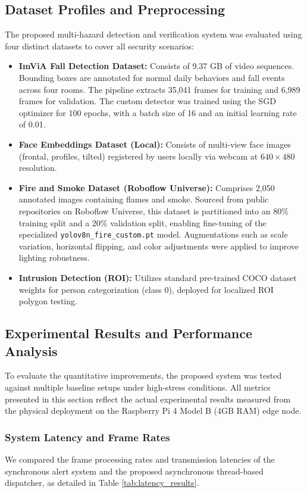 \documentclass[12pt,a4paper]{article}
\begin{document}
\subsection{Dataset Profiles and Preprocessing}
The proposed multi-hazard detection and verification system was evaluated using four distinct datasets to cover all security scenarios:
\begin{itemize}
    \item \textbf{ImViA Fall Detection Dataset:} Consists of 9.37 GB of video sequences. Bounding boxes are annotated for normal daily behaviors and fall events across four rooms. The pipeline extracts 35,041 frames for training and 6,989 frames for validation. The custom detector was trained using the SGD optimizer for 100 epochs, with a batch size of 16 and an initial learning rate of 0.01.
    \item \textbf{Face Embeddings Dataset (Local):} Consists of multi-view face images (frontal, profiles, tilted) registered by users locally via webcam at $640 \times 480$ resolution.
    \item \textbf{Fire and Smoke Dataset (Roboflow Universe):} Comprises 2,050 annotated images containing flames and smoke. Sourced from public repositories on Roboflow Universe, this dataset is partitioned into an 80\% training split and a 20\% validation split, enabling fine-tuning of the specialized \texttt{yolov8n\_fire\_custom.pt} model. Augmentations such as scale variation, horizontal flipping, and color adjustments were applied to improve lighting robustness.
    \item \textbf{Intrusion Detection (ROI):} Utilizes standard pre-trained COCO dataset weights for person categorization (class 0), deployed for localized ROI polygon testing.
\end{itemize}

\subsection{Experimental Results and Performance Analysis}
To evaluate the quantitative improvements, the proposed system was tested against multiple baseline setups under high-stress conditions. All metrics presented in this section reflect the actual experimental results measured from the physical deployment on the Raspberry Pi 4 Model B (4GB RAM) edge node.

\subsubsection*{System Latency and Frame Rates}
We compared the frame processing rates and transmission latencies of the synchronous alert system and the proposed asynchronous thread-based dispatcher, as detailed in Table \ref{tab:latency_results}.
\end{document}
